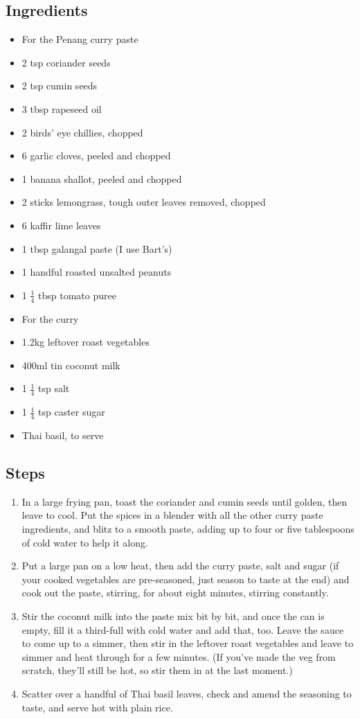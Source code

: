 \documentclass{book}
\begin{document}
\subsection*{Ingredients}
\begin{itemize}
\item For the Penang curry paste 
\item 2 tsp coriander seeds 
\item 2 tsp cumin seeds 
\item 3 tbsp rapeseed oil 
\item 2 birds’ eye chillies, chopped 
\item 6 garlic cloves, peeled and chopped 
\item 1 banana shallot, peeled and chopped 
\item 2 sticks lemongrass, tough outer leaves removed, chopped 
\item 6 kaffir lime leaves 
\item 1 tbsp galangal paste (I use Bart’s) 
\item 1 handful roasted unsalted peanuts
\item 1 $\frac{1}{4}$ tbsp tomato puree
\end{itemize}

\begin{itemize}
\item For the curry
\item 1.2kg leftover roast vegetables 
\item 400ml tin coconut milk 
\item 1 $\frac{1}{4}$ tsp salt
\item 1 $\frac{1}{4}$ tsp caster sugar
\item Thai basil, to serve 
\end{itemize}

\subsection*{Steps}
\begin{enumerate}
\item In a large frying pan, toast the coriander and cumin seeds until golden, then leave to cool. Put the spices in a blender with all the other curry paste ingredients, and blitz to a smooth paste, adding up to four or five tablespoons of cold water to help it along.
\item Put a large pan on a low heat, then add the curry paste, salt and sugar (if your cooked vegetables are pre-seasoned, just season to taste at the end) and cook out the paste, stirring, for about eight minutes, stirring constantly.
\item Stir the coconut milk into the paste mix bit by bit, and once the can is empty, fill it a third-full with cold water and add that, too. Leave the sauce to come up to a simmer, then stir in the leftover roast vegetables and leave to simmer and heat through for a few minutes. (If you’ve made the veg from scratch, they’ll still be hot, so stir them in at the last moment.)
\item Scatter over a handful of Thai basil leaves, check and amend the seasoning to taste, and serve hot with plain rice.
\end{enumerate}
\newpage
\end{document}
